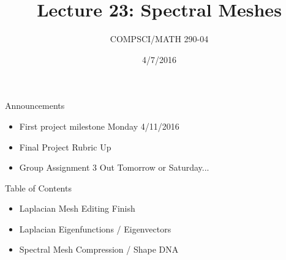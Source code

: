 \documentclass{beamer}
\title{Lecture 23: Spectral Meshes}
\date{4/7/2016}
\institute{Chris Tralie, Duke University}
\author{COMPSCI/MATH 290-04}
\begin{document}
\frame{\titlepage}

\begin{frame}{Announcements}
\begin{itemize}[label=$\vartriangleright$]

\item First project milestone Monday 4/11/2016

\item Final Project Rubric Up

\item Group Assignment 3 Out Tomorrow or Saturday...

\end{itemize}

\end{frame}

\begin{frame}{Table of Contents}

\begin{itemize}[label=$\blacktriangleright$]
	\item Laplacian Mesh Editing Finish
\end{itemize}

\begin{itemize}[label=$\vartriangleright$]
	\item Laplacian Eigenfunctions / Eigenvectors
\end{itemize}

\begin{itemize}[label=$\vartriangleright$]
	\item Spectral Mesh Compression / Shape DNA
\end{itemize}

\end{frame}
\end{document}
